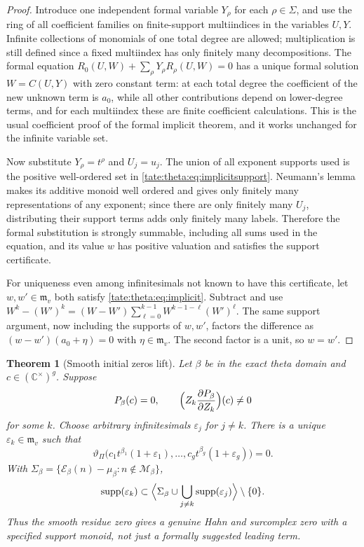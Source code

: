 \documentclass[11pt,letterpaper]{article}
\newtheorem{theorem}{Theorem}[section]
\theoremstyle{definition}
\newcommand{\C}{\mathbb C}
\newcommand{\supp}{\operatorname{supp}}
\newcommand{\m}{\mathfrak m}
\newcommand{\cE}{\mathcal E}
\newcommand{\cM}{\mathcal M}
\begin{document}
\begin{proof}
Introduce one independent formal variable $Y_\rho$ for each
$\rho\in\Sigma$, and use the ring of all coefficient families on
finite-support multiindices in the variables $U,Y$. Infinite collections of
monomials of one total degree are allowed; multiplication is still defined
since a fixed multiindex has only finitely many decompositions. The formal
equation $R_0(U,W)+\sum_\rho Y_\rho R_\rho(U,W)=0$ has a unique formal
solution $W=C(U,Y)$ with zero constant term: at each total degree the
coefficient of the new unknown term is $a_0$, while all other contributions
depend on lower-degree terms, and for each multiindex these are finite
coefficient calculations. This is the usual coefficient proof of the formal
implicit theorem, and it works unchanged for the infinite variable set.

Now substitute $Y_\rho=t^\rho$ and $U_j=u_j$. The union of all exponent
supports used is the positive well-ordered set in
\eqref{tate:theta:eq:implicitsupport}. Neumann's lemma makes its additive
monoid well ordered and gives only finitely many representations of any
exponent; since there are only finitely many $U_j$, distributing their
support terms adds only finitely many labels. Therefore the formal
substitution is strongly summable, including all sums used in the
equation, and its value $w$ has positive valuation and satisfies the
support certificate.

For uniqueness even among infinitesimals not known to have this
certificate, let $w,w'\in\m_v$ both satisfy \eqref{tate:theta:eq:implicit}.
Subtract and use
$W^k-(W')^k=(W-W')\sum_{\ell=0}^{k-1}W^{k-1-\ell}(W')^\ell$. The same
support argument, now including the supports of $w,w'$, factors the
difference as $(w-w')(a_0+\eta)=0$ with $\eta\in\m_v$. The second factor is
a unit, so $w=w'$.
\end{proof}

\begin{theorem}[Smooth initial zeros lift]\label{tate:theta:thm:zerolift}
Let $\beta$ be in the exact theta domain and $c\in(\C^\times)^g$. Suppose
\[
 P_\beta(c)=0,\qquad
 \Bigl(Z_k\frac{\partial P_\beta}{\partial Z_k}\Bigr)(c)\ne0
\]
for some $k$. Choose arbitrary infinitesimals $\varepsilon_j$ for $j\ne k$.
There is a unique $\varepsilon_k\in\m_v$ such that
\begin{equation}
 \vartheta_\Pi\bigl(c_1t^{\beta_1}(1+\varepsilon_1),\ldots,
                c_gt^{\beta_g}(1+\varepsilon_g)\bigr)=0.
 \label{tate:theta:eq:thetalift}
\end{equation}
With $\Sigma_\beta=\{\cE_\beta(n)-\mu_\beta:n\notin\cM_\beta\}$,
\begin{equation}
 \supp(\varepsilon_k)\subset
 \Bigl\langle\Sigma_\beta\cup\bigcup_{j\ne k}\supp(\varepsilon_j)\Bigr\rangle
 \setminus\{0\}.\label{tate:theta:eq:zerosupport}
\end{equation}
Thus the smooth residue zero gives a genuine Hahn and surcomplex zero with a
specified support monoid, not just a formally suggested leading term.
\end{theorem}
\end{document}
